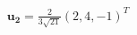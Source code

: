 \documentclass[preview]{standalone}
\begin{document}
\begin{align*}
\mathbf{u_2}    =   \frac{2}{3 \sqrt{21  }}  (2, 4, -1)^T
\end{align*}
\end{document}
